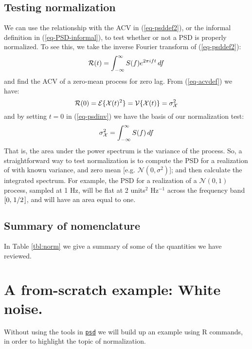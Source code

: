 \documentclass[10pt]{article}\usepackage{graphicx, color}
\newcommand{\Rcmd}[1]{\texttt{#1}}
\newcommand{\psd}[0]{\href{http://abarbour.github.com/psd/}{\color{blue}\Rcmd{psd}}}
\newcommand{\idx}[1]{\index{#1}{#1}}
\begin{document}
\subsection{Testing normalization}
We can use the relationship with the ACV in (\ref{eq-psddef2}), or
the informal definition in (\ref{eq-PSD-informal}),
to test whether or not a PSD is properly normalized.  
To see this, we take the
inverse Fourier transform of (\ref{eq-psddef2}):
%
\begin{equation}
\label{eq-psdinv}
\mathcal{R}(t) = \int_{- \infty} ^{\infty} S(f){} e ^ {2 \pi i ft} \, df
\end{equation}
%
and find the ACV of a zero-mean 
process for zero lag.  From (\ref{eq-acvdef}) we have:
%
\begin{equation}
\label{eq-acvprop}
\mathcal{R}(0) = \mathcal{E} \{ \mathcal{X}(t){}^2 \} = \mathcal{V} \{ \mathcal{X}(t){} \} = \sigma_\mathcal{X} ^ 2
\end{equation}
%
and by setting $t = 0$ in
(\ref{eq-psdinv}) we have the basis of our normalization test:
%
\begin{equation}
\label{eq-psdnorm}
\sigma_\mathcal{X} ^ 2 = \int_{- \infty} ^{\infty} S (f) \, df
\end{equation}
%
That is,
the area under the power spectrum is the variance
of the process.
So, a straightforward way to test normalization 
is to compute the PSD for a realization of \dXstoch{} with
known variance, and zero mean [e.g. $\mathcal{N}(0,\sigma^2)$]; and then
calculate the integrated spectrum.
For example, the \idx{single-sided}
PSD for a realization of a $\mathcal{N}(0, 1)$ process, 
sampled at 1 Hz, 
will be flat at 2 units$^2$ Hz$^{-1}$
across the frequency band $[0, \left.1\middle/2\right.]$,
and will have
an area equal to one.

\subsection{Summary of nomenclature}

In Table \ref{tbl:norm} we give a summary of some
of the quantities we have reviewed.



\section{A from-scratch example: White noise.}
Without using the tools in \psd{} we will build up an example
using R commands, in order to highlight the topic of normalization.
\end{document}
